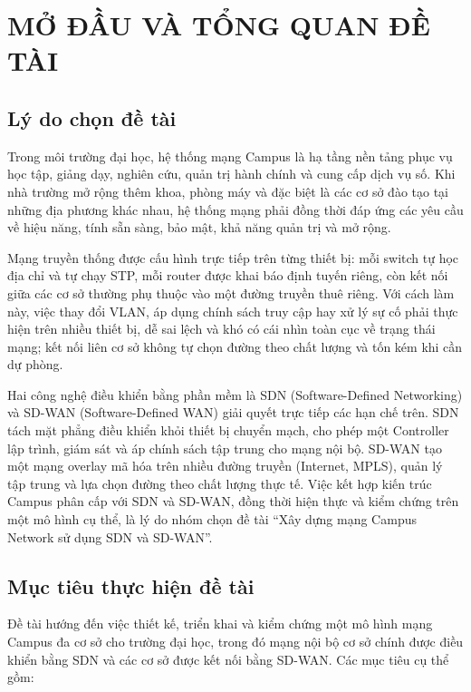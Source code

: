 \section{MỞ ĐẦU VÀ TỔNG QUAN ĐỀ TÀI}\label{sec:mo_dau_tong_quan}

\subsection{Lý do chọn đề tài}

Trong môi trường đại học, hệ thống mạng Campus là hạ tầng nền tảng phục vụ học tập, giảng dạy, nghiên cứu, quản trị hành chính và cung cấp dịch vụ số. Khi nhà trường mở rộng thêm khoa, phòng máy và đặc biệt là các cơ sở đào tạo tại những địa phương khác nhau, hệ thống mạng phải đồng thời đáp ứng các yêu cầu về hiệu năng, tính sẵn sàng, bảo mật, khả năng quản trị và mở rộng.

Mạng truyền thống được cấu hình trực tiếp trên từng thiết bị: mỗi switch tự học địa chỉ và tự chạy STP, mỗi router được khai báo định tuyến riêng, còn kết nối giữa các cơ sở thường phụ thuộc vào một đường truyền thuê riêng. Với cách làm này, việc thay đổi VLAN, áp dụng chính sách truy cập hay xử lý sự cố phải thực hiện trên nhiều thiết bị, dễ sai lệch và khó có cái nhìn toàn cục về trạng thái mạng; kết nối liên cơ sở không tự chọn đường theo chất lượng và tốn kém khi cần dự phòng.

Hai công nghệ điều khiển bằng phần mềm là SDN (Software-Defined Networking) và SD-WAN (Software-Defined WAN) giải quyết trực tiếp các hạn chế trên. SDN tách mặt phẳng điều khiển khỏi thiết bị chuyển mạch, cho phép một Controller lập trình, giám sát và áp chính sách tập trung cho mạng nội bộ. SD-WAN tạo một mạng overlay mã hóa trên nhiều đường truyền (Internet, MPLS), quản lý tập trung và lựa chọn đường theo chất lượng thực tế. Việc kết hợp kiến trúc Campus phân cấp với SDN và SD-WAN, đồng thời hiện thực và kiểm chứng trên một mô hình cụ thể, là lý do nhóm chọn đề tài ``Xây dựng mạng Campus Network sử dụng SDN và SD-WAN''.

\subsection{Mục tiêu thực hiện đề tài}

Đề tài hướng đến việc thiết kế, triển khai và kiểm chứng một mô hình mạng Campus đa cơ sở cho trường đại học, trong đó mạng nội bộ cơ sở chính được điều khiển bằng SDN và các cơ sở được kết nối bằng SD-WAN. Các mục tiêu cụ thể gồm:


